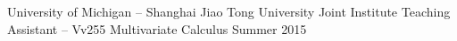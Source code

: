 \begin{cvteachingexps}
  \cvteachingexp
    {University of Michigan – Shanghai Jiao Tong University Joint Institute} %
    {Teaching Assistant – Vv255 Multivariate Calculus} %
    {Summer 2015} %
    {
      ~%
    } %

\end{cvteachingexps}